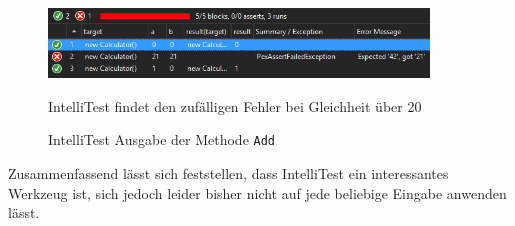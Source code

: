 \begin{figure}[!ht]
	\centering
	\includegraphics[width=0.9\textwidth]{images/intellitest.png}
	\caption{IntelliTest Ausgabe der Methode \texttt{Add}}
	\vspace{0.1cm}
	IntelliTest findet den zufälligen Fehler bei Gleichheit über 20
	\label{fig:intellitest}
\end{figure}

Zusammenfassend lässt sich feststellen, dass IntelliTest ein interessantes Werkzeug ist, sich jedoch leider bisher nicht auf jede beliebige Eingabe anwenden lässt.